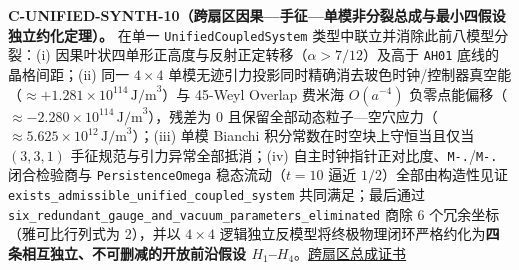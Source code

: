 \documentclass[
  11pt,
  oneside]{book}
\begin{document}
\protect\hypertarget{c-unified-synth-10}{}{}

\textbf{C-UNIFIED-SYNTH-10（跨扇区因果---手征---单模非分裂总成与最小四假设独立约化定理）。}
在单一 \texttt{Unified\allowbreak Coupled\allowbreak System} 类型中联立并消除此前八模型分裂：(i)
因果叶状四单形正高度与反射正定转移（\(\alpha > 7/12\)）及高于
\texttt{AH01} 底线的晶格间距；(ii) 同一 \(4\times 4\)
单模无迹引力投影同时精确消去玻色时钟/控制器真空能（\(\approx +1.281\times 10^{114}\,\mathrm{J/m}^3\)）与
45-Weyl Overlap 费米海 \(O(a^{-4})\)
负零点能偏移（\(\approx -2.280\times 10^{114}\,\mathrm{J/m}^3\)），残差为
\(0\)
且保留全部动态粒子---空穴应力（\(\approx 5.625\times 10^{12}\,\mathrm{J/m}^3\)）；(iii)
单模 Bianchi 积分常数在时空块上守恒当且仅当 \((3,3,1)\)
手征规范与引力异常全部抵消；(iv)
自主时钟指针正对比度、\texttt{M-.}/\texttt{M-.} 闭合检验商与
\texttt{Persistence\allowbreak Omega} 稳态流动（\(t=10\) 逼近
\(1/2\)）全部由构造性见证
\texttt{exists\_\allowbreak admissible\_\allowbreak unified\_\allowbreak coupled\_\allowbreak system} 共同满足；最后通过
\texttt{six\_\allowbreak redundant\_\allowbreak gauge\_\allowbreak and\_\allowbreak vacuum\_\allowbreak parameters\_\allowbreak eliminated} 商除
6 个冗余坐标（雅可比行列式为 2），并以 \(4\times 4\)
逻辑独立反模型将终极物理闭环严格约化为\textbf{四条相互独立、不可删减的开放前沿假设
\(H_1\)--\(H_4\)}。\href{../../unification/unified_causal_chiral_unimodular/certificate.json}{跨扇区总成证书}
\end{document}
